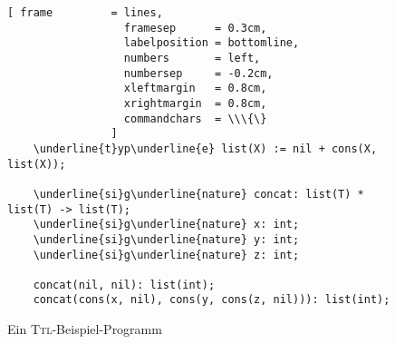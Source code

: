 \begin{figure}[!ht]
\centering
\begin{Verbatim}[ frame         = lines, 
                  framesep      = 0.3cm, 
                  labelposition = bottomline,
                  numbers       = left,
                  numbersep     = -0.2cm,
                  xleftmargin   = 0.8cm,
                  xrightmargin  = 0.8cm,
                  commandchars  = \\\{\}
                ]
    \underline{t}yp\underline{e} list(X) := nil + cons(X, list(X));
    
    \underline{si}g\underline{nature} concat: list(T) * list(T) -> list(T);
    \underline{si}g\underline{nature} x: int;
    \underline{si}g\underline{nature} y: int;
    \underline{si}g\underline{nature} z: int;
    
    concat(nil, nil): list(int);
    concat(cons(x, nil), cons(y, cons(z, nil))): list(int);
\end{Verbatim}
\vspace*{-0.3cm}
\caption{Ein \textsc{Ttl}-Beispiel-Programm}
\label{fig:types.ttl}
\end{figure}

